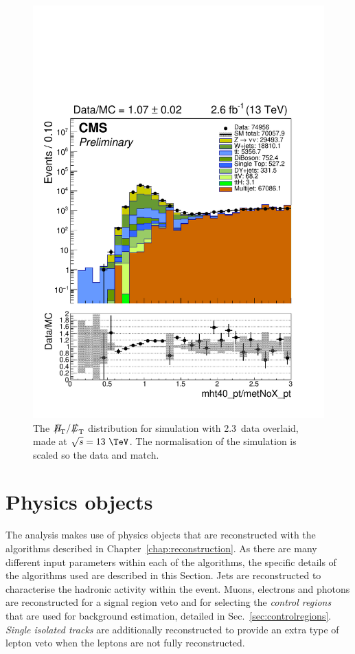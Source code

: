 \begin{figure}
	\begin{center}
		\includegraphics[width=0.7\linewidth]{figs/analysis/eventSelection/mht40_pt_Div_metNoX_pt_all_all_80X_noOverflow_scaled0p6}%
	\end{center}
  \caption{The $\MHT/\MET$ distribution for \MC simulation with
  2.3~\ifb data overlaid, made at $\sqrt{s}=13~\tev$. The
  normalisation of the \MC simulation is scaled so the data and \MC
  match.}
	\label{fig:mhtDivMet}
\end{figure}

\section{Physics objects} %
\label{sec:physobj}

The analysis makes use of physics objects that are reconstructed with
the algorithms described in Chapter~\ref{chap:reconstruction}. As
there are many different input parameters within each of the
algorithms, the specific details of the algorithms used are described
in this Section. Jets are reconstructed to characterise the
hadronic activity within the event. Muons, electrons and photons are
reconstructed for a signal region veto and for selecting the \emph{control
regions} that are used for background estimation, detailed in
Sec.~\ref{sec:controlregions}. \emph{Single isolated tracks} are additionally
reconstructed to provide an extra type of lepton veto when the leptons
are not fully reconstructed.

